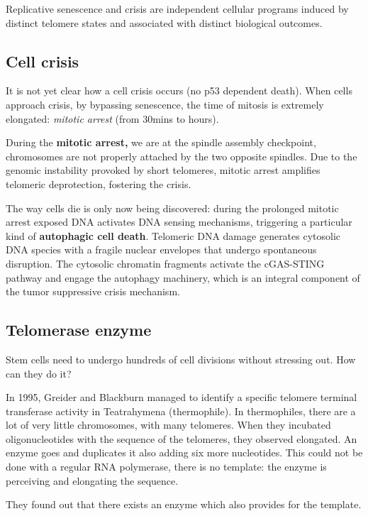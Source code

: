 Replicative senescence and crisis are independent cellular programs
induced by distinct telomere states and associated with distinct
biological outcomes.

\hypertarget{cell-crisis}{%
\subsection{Cell crisis}\label{cell-crisis}}

It is not yet clear how a cell crisis occurs (no p53 dependent death).
When cells approach crisis, by bypassing senescence, the time of mitosis
is extremely elongated: \emph{mitotic arrest} (from 30mins to hours).

During the \textbf{mitotic arrest,} we are at the spindle assembly
checkpoint, chromosomes are not properly attached by the two opposite
spindles. Due to the genomic instability provoked by short telomeres,
mitotic arrest amplifies telomeric deprotection, fostering the crisis.

The way cells die is only now being discovered: during the prolonged
mitotic arrest exposed DNA activates DNA sensing mechanisms, triggering
a particular kind of \textbf{autophagic cell death}. Telomeric DNA
damage generates cytosolic DNA species with a fragile nuclear envelopes
that undergo spontaneous disruption. The cytosolic chromatin fragments
activate the cGAS-STING pathway and engage the autophagy machinery,
which is an integral component of the tumor suppressive crisis
mechanism.

\hypertarget{telomerase-enzyme}{%
\subsection{Telomerase enzyme}\label{telomerase-enzyme}}

Stem cells need to undergo hundreds of cell divisions without stressing
out. How can they do it?

In 1995, Greider and Blackburn managed to identify a specific telomere
terminal transferase activity in Teatrahymena (thermophile). In
thermophiles, there are a lot of very little chromosomes, with many
telomeres. When they incubated oligonucleotides with the sequence of the
telomeres, they observed elongated. An enzyme goes and duplicates it
also adding six more nucleotides. This could not be done with a regular
RNA polymerase, there is no template: the enzyme is perceiving and
elongating the sequence.

They found out that there exists an enzyme which also provides for the
template.

